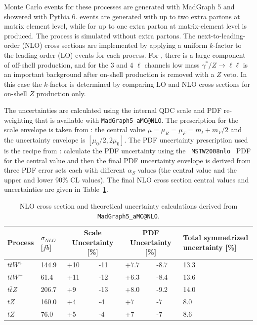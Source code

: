 Monte Carlo events for these processes are generated with MadGraph 5 and showered with Pythia 6.  \ttW events are generated with up to two extra partons at matrix element level, while for \ttZ up to one extra parton at matrix-element level is produced.  The \tZ process is simulated without extra partons.  The next-to-leading-order (NLO) cross sections are implemented by applying a uniform $k$-factor to the leading-order (LO) events for each process.  For \ttZ, there is a large component of off-shell production, and for the 3 and 4 $\ell$ channels low mass $\gamma^*/Z \to \ell\ell$ is an important background after on-shell production is removed with a $Z$ veto.  In this case the $k$-factor is determined by comparing LO and NLO cross sections for on-shell $Z$ production only.   

The \ttV uncertainties are calculated
using the internal QDC scale and PDF re-weighting that is available with
{\tt MadGraph5\_aMC@NLO}. The prescription for the scale envelope is taken from
\cite{Garzelli:2012bn}: the central value $\mu=\mu_{R}=\mu_{F}=m_t+m_V/2$
and the uncertainty envelope is $[\mu_{0}/2,2\mu_{0}]$. The PDF
uncertainty prescription used is the recipe from
\cite{Campbell:2012dh}: calculate the PDF uncertainty using the {\tt
MSTW2008nlo}~\cite{Martin:2009iq} PDF for the central value and then the final PDF
uncertainty envelope is derived from three PDF error sets each with
different $\alpha_S$ values (the central value and the upper and lower
90\% CL values). The final NLO cross section central values and
uncertainties are given in Table~\ref{tab:ttVXSunc}.

\begin{table}%
\begin{center}
\caption{NLO cross section and theoretical uncertainty
  calculations derived from {\tt MadGraph5\_aMC@NLO}.}
\label{tab:ttVXSunc}
\begin{tabular}{l|p{}|p{}|p{}|p{}|p{}|p{}}
\hline
Process & $\sigma_{NLO}$ [$fb$] & \multicolumn{2}{c|}{Scale
Uncertainty [\%]} & \multicolumn{2}{c|}{PDF Uncertainty [\%]} & Total
symmetrized uncertainty [\%] \\
\hline
\hline
$t\bar{t}W^{+}$ & 144.9 & +10 & -11 & +7.7 & -8.7 & 13.3 \\
$t\bar{t}W^{-}$ & 61.4  & +11 & -12 & +6.3 & -8.4 & 13.6 \\
$t\bar{t}Z$     & 206.7 & +9  & -13 & +8.0 & -9.2 & 14.0 \\
$tZ$            & 160.0 & +4  & -4  & +7   & -7   & 8.0 \\
$\bar{t}Z$      & 76.0  & +5  & -4  & +7   & -7   & 8.6 \\
\hline
\end{tabular}
\end{center}
\end{table}

